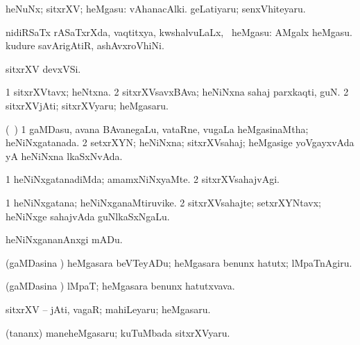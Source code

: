 {{{{{{\bentry
{} 
\gl{\gu}
\expl{}
\bmng
heNuNx; sitxrXV; heMgasu:  vAhanacAlki.  geLatiyaru; senxVhiteyaru. 
\emng
\eentry

\bentry
{} 
\gl{\sapUpa}
\expl{}
\bmng
nidiRSaTx rASaTxrXda, vaqtitxya, kwshalvuLaLx, \mo\ heMgasu:  AMgalx heMgasu.  kudure savArigAtiR, ashAvxroVhiNi. 
\emng
\eentry

\bentry
{} 
\gl{\nA}
\expl{}
\bmng
sitxrXV devxVSi. 
\emng
\eentry

\bentry
{} 
\gl{\nA}
\expl{}
\bmng
\bnum
\num{1} sitxrXVtavx; heNtxna. 
\num{2} sitxrXVsavxBAva; heNiNxna sahaj parxkaqti, guN. 
\num{2} sitxrXVjAti; sitxrXVyaru; heMgasaru. 
\enum
\emng
\eentry

\bentry
{} 
\gl{\sakirx}
\expl{}
\bmng
{} 
\emng
\eentry

\bentry
{} 
\gl{\gu}
\expl{}
\bmng
(\sA\ \hiV) 
\bnum
\num{1} gaMDasu, avana BAvanegaLu, vataRne, \mo vugaLa \vi heMgasinaMtha; heNiNxgatanada. 
\num{2} setxrXYN; heNiNxna; sitxrXVsahaj; heMgasige yoVgayxvAda yA heNiNxna lkaSxNvAda. 
\enum
\emng
\eentry

\bentry
{} 
\gl{\kirxvi}
\expl{}
\bmng
\bnum
\num{1} heNiNxgatanadiMda; amamxNiNxyaMte. 
\num{2} sitxrXVsahajvAgi. 
\enum
\emng
\eentry

\bentry
{} 
\gl{\nA}
\expl{}
\bmng
\bnum
\num{1} heNiNxgatana; heNiNxganaMtiruvike. 
\num{2} sitxrXVsahajte; setxrXYNtavx; heNiNxge sahajvAda guNlkaSxNgaLu. 
\enum
\emng
\eentry

\bentry
{} 
\gl{\sakirx}
\expl{}
\bmng
heNiNxgananAnxgi mADu. 
\emng

\noindent
\gl{\akirx}
\expl{}
\bmng
(gaMDasina \vi) heMgasara beVTeyADu; heMgasara benunx hatutx; lMpaTnAgiru. 
\emng
\eentry

\bentry
{} 
\gl{\nA}
\expl{}
\bmng
(gaMDasina \vi) lMpaT; heMgasara benunx hatutxvava. 
\emng
\eentry

\bentry
{} 
\gl{\nA}
\expl{}
\bmng
sitxrXV -- jAti, vagaR; mahiLeyaru; heMgasaru. 
\emng

\noindent 
\gl{\pagu}
\expl{}
\bmng
{} (tananx) maneheMgasaru; kuTuMbada sitxrXVyaru. 
\emng
\eentry

}}}}}}
